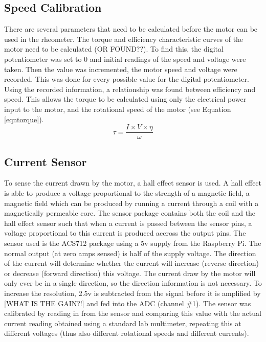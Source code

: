 \documentclass[a4]{report}
\def\br{\newline \newline \noindent}
\begin{document}
	
	
	\subsection{Speed Calibration} %
	There are several parameters that need to be calculated before the motor can be used in the rheometer. The torque and efficiency characteristic curves of the motor need to be calculated (OR FOUND??). To find this, the digital potentiometer was set to 0 and initial readings of the speed and voltage were taken. Then the value was incremented, the motor speed and voltage were recorded. This was done for every possible value for the digital potentiometer. Using the recorded information, a relationship was found between efficiency and speed. This allows the torque to be calculated using only the electrical power input to the motor, and the rotational speed of the motor (see Equation \ref{eqntorque}).
	\begin{equation}
	\tau = \frac{I \times V \times \eta}{\omega}
	\label{eqntorque}
	\end{equation}
	
	\subsection{Current Sensor}
	To sense the current drawn by the motor, a hall effect sensor is used. A hall effect is able to produce a voltage proportional to the strength of a magnetic field, a magnetic field which can be produced by running a current through a coil with a magnetically permeable core. The sensor package contains both the coil and the hall effect sensor such that when a current is passed between the sensor pins, a voltage proportional to this current is produced accross the output pins. The sensor used is the ACS712 package using a 5v supply from the Raspberry Pi. The normal output (at zero amps sensed) is half of the supply voltage. The direction of the current will determine whether the current will increase (reverse direction) or decrease (forward direction) this voltage. \br
	The current draw by the motor will only ever be in a single direction, so the direction information is not necessary. To increase the resolution, 2.5v is subtracted from the signal before it is amplified by [WHAT IS THE GAIN?!] and fed into the ADC (channel \#1). \br
	The sensor was calibrated by reading in from the sensor and comparing this value with the actual current reading obtained using a standard lab multimeter, repeating this at different voltages (thus also different rotational speeds and different currents). \br
	[RESULTS AND SUCH]
	
\end{document}
